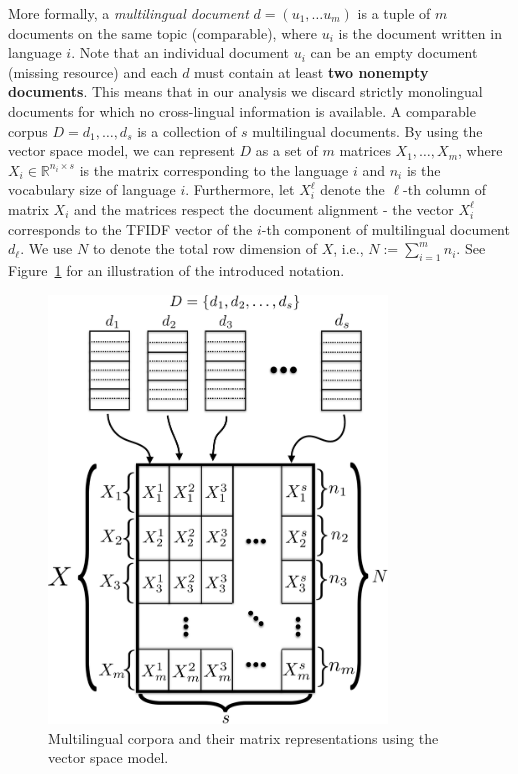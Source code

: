 \documentclass[twoside,11pt]{article}
\newcommand{\RR}{\mathbb{R}}
\begin{document}
More formally, a \emph{multilingual document} $d = (u_1,\ldots u_m)$ is a tuple of $m$ documents on the same topic (comparable), where $u_i$ is the document written in language $i$. Note that an individual document $u_i$ can be an empty document (missing resource) and each $d$ must contain at least \textbf{two nonempty documents}. This means that in our analysis we discard strictly monolingual documents for which no cross-lingual information is available. A comparable corpus $D = {d_1, \ldots, d_s}$ is a collection of $s$ multilingual documents. By using the vector space model, we can represent $D$ as a set of $m$ matrices $X_1,\ldots,X_m$, where $X_i \in \RR^{n_i \times s}$ is the matrix corresponding to the language $i$ and $n_i$ is the vocabulary size of language $i$. Furthermore, let $X_i^{\ell}$ denote the $\ell$-th column of matrix $X_i$ and the matrices respect the document alignment - the vector $X_i^\ell$ corresponds to the TFIDF vector of the $i$-th component of multilingual document $d_\ell$. We use $N$ to denote the total row dimension of $X$, i.e., $N:= \sum_{i=1}^m n_i$. See Figure~\ref{fig:stacked_matrices} for an illustration of the introduced notation.

\begin{figure}[tbp]
\centering
\includegraphics[width=9cm]{stacked_matrices1-crop.pdf}
\caption{\label{fig:stacked_matrices} Multilingual corpora and their matrix representations using the vector space model.}
\end{figure}
\end{document}
